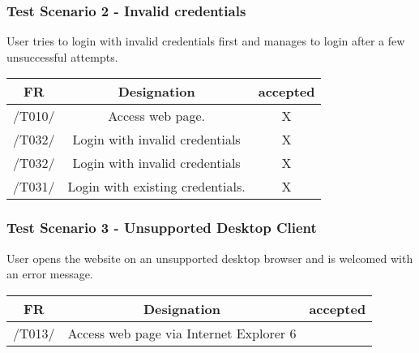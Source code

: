 \subsubsection{Test Scenario 2 - Invalid credentials}
User tries to login with invalid credentials first and manages to login after a few unsuccessful attempts.

\begin{table}[h]
\begin{tabular}{!{\VRule}c!{\VRule}c!{\VRule}c!{\VRule}}
 \hline
FR     & Designation                                                                  &accepted                \\
\hline
/T010/ & Access web page.                                                             &  X \\
\hline
/T032/ & Login with invalid credentials                                                                        &  X  \\
\hline
/T032/ & Login with invalid credentials                                               &  X {\color[HTML]{67FD9A} }                \\
\hline
/T031/ & Login with existing credentials. &  X {\color[HTML]{67FD9A} } \\
\hline

\end{tabular}
\end{table}

\subsubsection{Test Scenario 3 - Unsupported Desktop Client}
User opens the website on an unsupported desktop browser and is welcomed with an error message.
\begin{table}[h]
\begin{tabular}{!{\VRule}c!{\VRule}c!{\VRule}c!{\VRule}}
\hline
FR     & Designation                                                                  &accepted                \\
\hline
/T013/ & Access web page via Internet Explorer 6                                                                &{\color[HTML]{67FD9A} } \\
\hline


\end{tabular}
\end{table}


